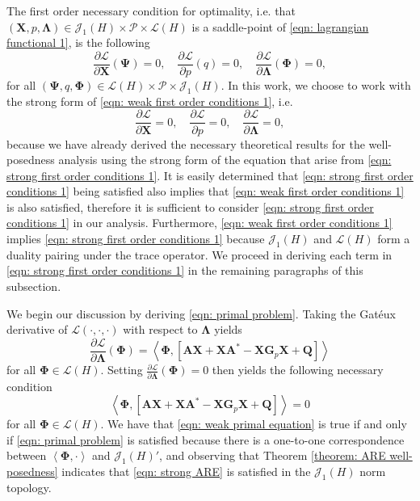 \documentclass{amsart}
\newcommand{\sL}{\mathscr L}
\newcommand{\sJ}{\mathscr J}
\newcommand{\p}[1]{\left( {#1} \right)}
\newcommand{\br}[1]{\left[ #1 \right]}
\newcommand{\dual}[1]{\left< #1 \right>}
\newcommand{\sP}{\mathcal{P}}
\newcommand{\bA}{\mathbf A}
\newcommand{\bX}{\mathbf X}
\newcommand{\bQ}{\mathbf Q}
\newcommand{\bG}{\mathbf G}
\newcommand{\bPhi}{\boldsymbol{\Phi}}
\newcommand{\bLambda}{\boldsymbol{\Lambda}}
\newcommand{\bPsi}{\boldsymbol{\Psi}}
\begin{document}
The first order necessary condition for optimality, i.e. that $\p{\bX,p,\bLambda} \in \sJ_1(H) \times \sP \times \sL(H)$ is a saddle-point of \eqref{eqn: lagrangian functional 1},  is the following
\begin{equation}
\label{eqn: weak first order conditions 1}
    \frac{\partial \mathcal L}{\partial \bX}(\bPsi) = 0, 
    \quad 
    \frac{\partial \mathcal L}{\partial p}(q) = 0, \quad
    \frac{\partial \mathcal L}{\partial \bLambda}(\bPhi) = 0,
\end{equation}
for all $\p{\bPsi, q, \bPhi} \in \sL(H)\times \sP \times \sJ_1(H)$. In this work, we choose to work with the strong form of \eqref{eqn: weak first order conditions 1}, i.e.
\begin{equation}
\label{eqn: strong first order conditions 1}
    \frac{\partial \mathcal L}{\partial \bX} = 0, 
    \quad 
    \frac{\partial \mathcal L}{\partial p} = 0, 
    \quad
    \frac{\partial \mathcal L}{\partial \bLambda} = 0,
\end{equation}
because we have already derived the necessary theoretical results for the well-posedness analysis using the strong form of the equation that arise from \eqref{eqn: strong first order conditions 1}. It is easily determined that \eqref{eqn: strong first order conditions 1} being satisfied also implies that \eqref{eqn: weak first order conditions 1} is also satisfied, therefore it is sufficient to consider \eqref{eqn: strong first order conditions 1} in our analysis. Furthermore, \eqref{eqn: weak first order conditions 1} implies \eqref{eqn: strong first order conditions 1} because $\sJ_1(H)$ and $\sL(H)$ form a duality pairing under the trace operator. We proceed in deriving each term in \eqref{eqn: strong first order conditions 1} in the remaining paragraphs of this subsection.

We begin our discussion by deriving \eqref{eqn: primal problem}. Taking the Gat\'eux derivative of $\mathcal L(\cdot, \cdot,\cdot)$ with respect to $\bLambda$ yields
$$
    \frac{\partial \mathcal L}{\partial \bLambda}(\bPhi) = 
    \dual{\bPhi,\br{\bA\bX + \bX\bA^* - \bX\bG_p \bX + \bQ}}
$$
for all $\bPhi \in \sL(H)$. Setting $\frac{\partial \mathcal L}{\partial \bLambda}(\bPhi) = 0$ then yields the following necessary condition
\begin{equation}
    \label{eqn: weak primal equation}
    \dual{\bPhi,\br{\bA\bX + \bX\bA^* - \bX\bG_p \bX + \bQ}} = 0
\end{equation}
for all $\bPhi \in \sL(H)$. We have that \eqref{eqn: weak primal equation} is true if and only if \eqref{eqn: primal problem} is satisfied  because there is a one-to-one correspondence between  $\dual{\bPhi,\cdot}$ and  $\sJ_1(H)'$, and observing that Theorem \ref{theorem: ARE well-posedness} indicates that \eqref{eqn: strong ARE} is satisfied in the $\sJ_1(H)$ norm topology.
\end{document}
